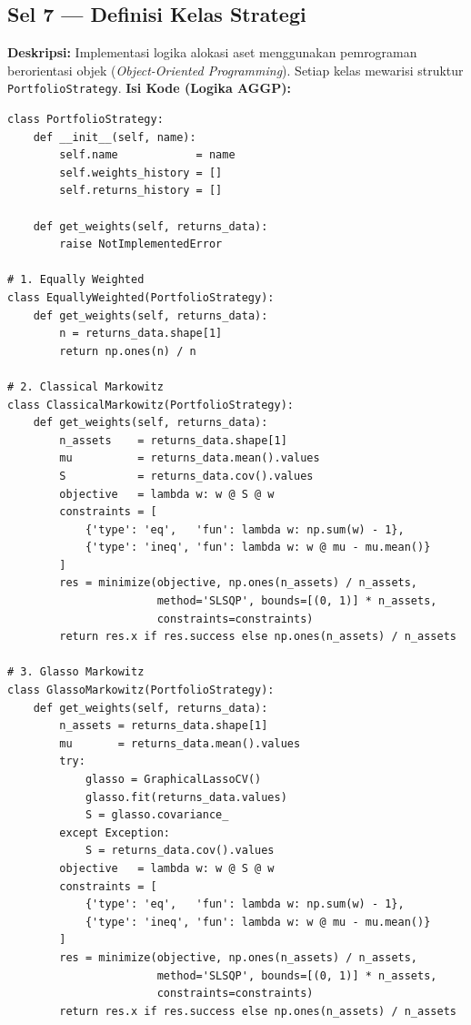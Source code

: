 \documentclass[12pt, a4paper]{article}
\begin{document}
\subsection{Sel 7 — Definisi Kelas Strategi}
\textbf{Deskripsi:} Implementasi logika alokasi aset menggunakan pemrograman berorientasi objek (\textit{Object-Oriented Programming}). Setiap kelas mewarisi struktur \texttt{PortfolioStrategy}.
\textbf{Isi Kode (Logika AGGP):}
\begin{lstlisting}
class PortfolioStrategy:
    def __init__(self, name):
        self.name            = name
        self.weights_history = []
        self.returns_history = []

    def get_weights(self, returns_data):
        raise NotImplementedError

# 1. Equally Weighted
class EquallyWeighted(PortfolioStrategy):
    def get_weights(self, returns_data):
        n = returns_data.shape[1]
        return np.ones(n) / n

# 2. Classical Markowitz
class ClassicalMarkowitz(PortfolioStrategy):
    def get_weights(self, returns_data):
        n_assets    = returns_data.shape[1]
        mu          = returns_data.mean().values
        S           = returns_data.cov().values
        objective   = lambda w: w @ S @ w
        constraints = [
            {'type': 'eq',   'fun': lambda w: np.sum(w) - 1},
            {'type': 'ineq', 'fun': lambda w: w @ mu - mu.mean()}
        ]
        res = minimize(objective, np.ones(n_assets) / n_assets,
                       method='SLSQP', bounds=[(0, 1)] * n_assets,
                       constraints=constraints)
        return res.x if res.success else np.ones(n_assets) / n_assets

# 3. Glasso Markowitz
class GlassoMarkowitz(PortfolioStrategy):
    def get_weights(self, returns_data):
        n_assets = returns_data.shape[1]
        mu       = returns_data.mean().values
        try:
            glasso = GraphicalLassoCV()
            glasso.fit(returns_data.values)
            S = glasso.covariance_
        except Exception:
            S = returns_data.cov().values
        objective   = lambda w: w @ S @ w
        constraints = [
            {'type': 'eq',   'fun': lambda w: np.sum(w) - 1},
            {'type': 'ineq', 'fun': lambda w: w @ mu - mu.mean()}
        ]
        res = minimize(objective, np.ones(n_assets) / n_assets,
                       method='SLSQP', bounds=[(0, 1)] * n_assets,
                       constraints=constraints)
        return res.x if res.success else np.ones(n_assets) / n_assets


\end{lstlisting}
\end{document}
